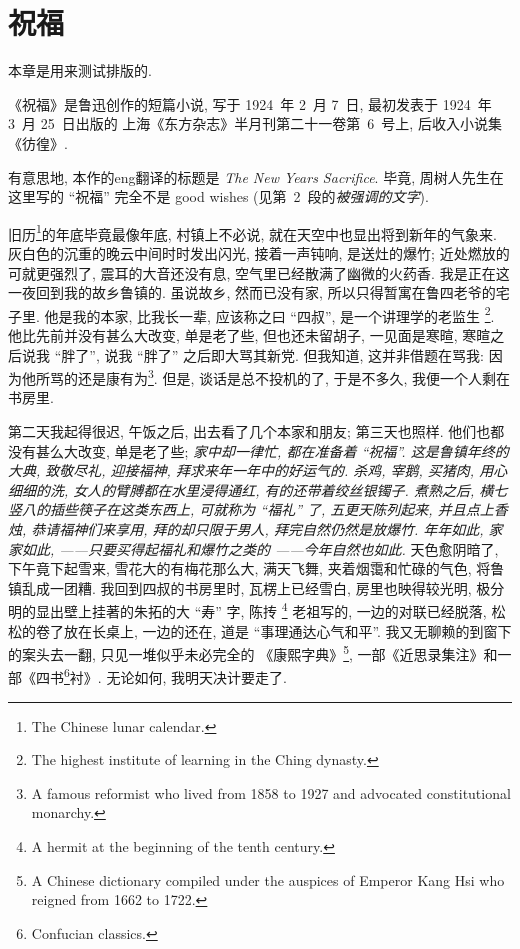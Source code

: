 \chapter{祝福}

\begin{remark*}
    本章是用来测试排版的.
\end{remark*}

\begin{remark*}
    《祝福》是鲁迅创作的短篇小说,
    写于 1924~年 2~月 7~日,
    最初发表于 1924~年 3~月 25~日出版的%
    上海《东方杂志》半月刊第二十一卷第~6~号上,
    后收入小说集《彷徨》.
\end{remark*}

\begin{remark*}
    有意思地, 本作的\gls{eng}翻译的标题是
    \textit{The New Year\textquotesingle{}s Sacrifice}.
    毕竟, 周树人先生在这里写的 ``祝福'' 完全不是
    good wishes (见第~2~段的\emph{被强调的文字}).
\end{remark*}

旧历\footnote{The Chinese lunar calendar.}的年底毕竟最像年底,
村镇上不必说, 就在天空中也显出将到新年的气象来.
灰白色的沉重的晚云中间时时发出闪光, 接着一声钝响, 是送灶的爆竹;
近处燃放的可就更强烈了, 震耳的大音还没有息,
空气里已经散满了幽微的火药香.
我是正在这一夜回到我的故乡鲁镇的.
虽说故乡, 然而已没有家, 所以只得暂寓在鲁四老爷的宅子里.
他是我的本家, 比我长一辈, 应该称之曰 ``四叔'',
是一个讲理学的老监生%
\footnote{The highest institute of learning in the Ching dynasty.}.
他比先前并没有甚么大改变, 单是老了些, 但也还未留胡子,
一见面是寒暄, 寒暄之后说我 ``胖了'',
说我 ``胖了'' 之后即大骂其新党.
但我知道, 这并非借题在骂我:
因为他所骂的还是康有为\footnote{A famous reformist who lived
    from 1858 to 1927 and advocated constitutional monarchy.}.
但是, 谈话是总不投机的了, 于是不多久, 我便一个人剩在书房里.

第二天我起得很迟, 午饭之后, 出去看了几个本家和朋友;
第三天也照样.
他们也都没有甚么大改变, 单是老了些;
\emph{%
    家中却一律忙, 都在准备着 ``祝福''.
    这是鲁镇年终的大典, 致敬尽礼, 迎接福神,
    拜求来年一年中的好运气的.
    杀鸡, 宰鹅, 买猪肉, 用心细细的洗,
    女人的臂膊都在水里浸得通红, 有的还带着绞丝银镯子.
    煮熟之后, 横七竖八的插些筷子在这类东西上,
    可就称为 ``福礼'' 了, 五更天陈列起来, 并且点上香烛,
    恭请福神们来享用, 拜的却只限于男人, 拜完自然仍然是放爆竹.
    年年如此, 家家如此, ——只要买得起福礼和爆竹之类的%
    ——今年自然也如此.%
}
天色愈阴暗了, 下午竟下起雪来, 雪花大的有梅花那么大,
满天飞舞, 夹着烟霭和忙碌的气色, 将鲁镇乱成一团糟.
我回到四叔的书房里时, 瓦楞上已经雪白, 房里也映得较光明,
极分明的显出壁上挂著的朱拓的大 ``寿'' 字, 陈抟%
\footnote{A hermit at the beginning of the tenth century.}%
老祖写的, 一边的对联已经脱落, 松松的卷了放在长桌上,
一边的还在, 道是 ``事理通达心气和平''.
我又无聊赖的到窗下的案头去一翻, 只见一堆似乎未必完全的
《康熙字典》\footnote{A Chinese dictionary compiled under
    the auspices of Emperor Kang Hsi who reigned from 1662
    to 1722.}, 一部《近思录集注》和一部《四书\footnote{%
    Confucian classics.}衬》.
无论如何, 我明天决计要走了.


